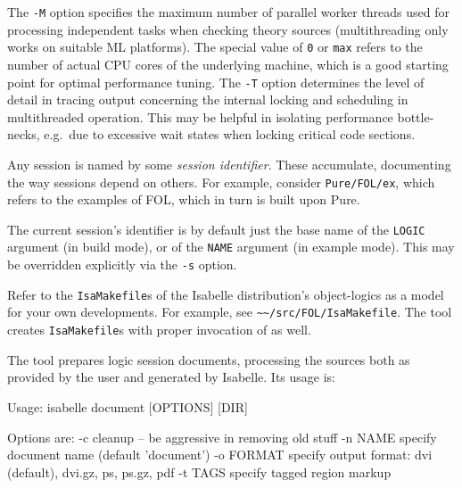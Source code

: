 \begin{isabellebody}
\begin{isamarkuptext}
  \medskip The \verb|-M| option specifies the maximum number of
  parallel worker threads used for processing independent tasks when
  checking theory sources (multithreading only works on suitable ML
  platforms).  The special value of \verb|0| or \verb|max|
  refers to the number of actual CPU cores of the underlying machine,
  which is a good starting point for optimal performance tuning.  The
  \verb|-T| option determines the level of detail in tracing
  output concerning the internal locking and scheduling in
  multithreaded operation.  This may be helpful in isolating
  performance bottle-necks, e.g.\ due to excessive wait states when
  locking critical code sections.

  \medskip Any \hyperlink{tool.usedir}{\mbox{}} session is named by some \emph{session
  identifier}. These accumulate, documenting the way sessions depend
  on others. For example, consider \verb|Pure/FOL/ex|, which
  refers to the examples of FOL, which in turn is built upon Pure.

  The current session's identifier is by default just the base name of
  the \verb|LOGIC| argument (in build mode), or of the \verb|NAME| argument (in example mode). This may be overridden explicitly
  via the \verb|-s| option.%
\end{isamarkuptext}%
\isamarkuptrue%
%
\isamarkuptrue%
%
\begin{isamarkuptext}%
Refer to the \verb|IsaMakefile|s of the Isabelle
  distribution's object-logics as a model for your own developments.
  For example, see \verb|~~/src/FOL/IsaMakefile|.  The \hyperlink{tool.mkdir}{\mbox{}} tool creates \verb|IsaMakefile|s with proper invocation
  of \hyperlink{tool.usedir}{\mbox{}} as well.%
\end{isamarkuptext}%
\isamarkuptrue%
%
\isamarkuptrue%
%
\begin{isamarkuptext}%
The \hypertarget{tool.document}{\hyperlink{tool.document}{\mbox{}}} tool prepares logic session
  documents, processing the sources both as provided by the user and
  generated by Isabelle.  Its usage is:
\begin{ttbox}
Usage: isabelle document [OPTIONS] [DIR]

  Options are:
    -c           cleanup -- be aggressive in removing old stuff
    -n NAME      specify document name (default 'document')
    -o FORMAT    specify output format: dvi (default), dvi.gz, ps,
                 ps.gz, pdf
    -t TAGS      specify tagged region markup


\end{ttbox}
\end{isamarkuptext}
\end{isabellebody}
